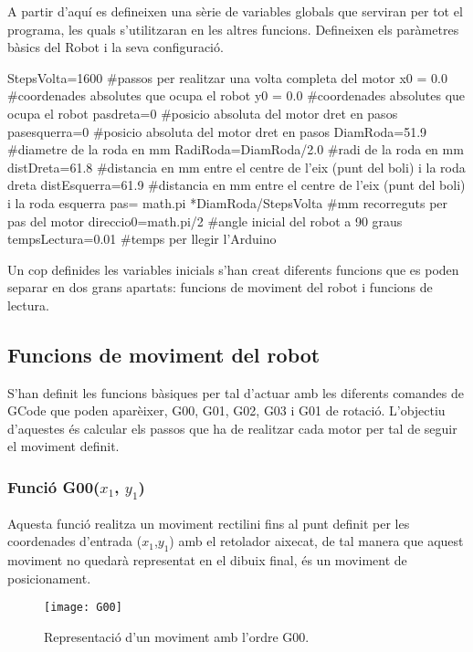 A partir d’aquí es defineixen una sèrie de variables globals que serviran per tot el programa, les quals s’utilitzaran en les altres funcions. Defineixen els paràmetres bàsics del Robot i la seva configuració. 

\begin{python}
	StepsVolta=1600  #passos per realitzar una volta completa del motor
	x0 = 0.0  #coordenades absolutes que ocupa el robot
	y0 = 0.0  #coordenades absolutes que ocupa el robot
	pasdreta=0  #posicio absoluta del motor dret en pasos
	pasesquerra=0  #posicio absoluta del motor dret en pasos
	DiamRoda=51.9  #diametre de la roda en mm
	RadiRoda=DiamRoda/2.0  #radi de la roda en mm
	distDreta=61.8  #distancia en mm entre el centre de l'eix (punt del boli) i la roda dreta
	distEsquerra=61.9  #distancia en mm entre el centre de l'eix (punt del boli) i la roda esquerra
	pas= math.pi *DiamRoda/StepsVolta  #mm recorreguts per pas del motor
	direccio0=math.pi/2  #angle inicial del robot a 90 graus
	tempsLectura=0.01  #temps per llegir l'Arduino 
\end{python}


Un cop definides les variables inicials s’han creat diferents funcions que es poden separar en dos grans apartats: funcions de moviment del robot i funcions de lectura. 

\subsection{Funcions de moviment del robot}
S’han definit les funcions bàsiques per tal d’actuar amb les diferents comandes de GCode que poden aparèixer, G00, G01, G02, G03 i G01 de rotació. L’objectiu d’aquestes és calcular els passos que ha de realitzar cada motor per tal de seguir el moviment definit. 

\subsubsection{Funció G00($x_{1}$, $y_{1}$)}\label{sec:G00}

Aquesta funció realitza un moviment rectilini fins al punt definit per les coordenades d’entrada ($x_{1}$,$y_{1}$) amb el retolador aixecat, de tal manera que aquest moviment no quedarà representat en el dibuix final, és un moviment de posicionament.

\begin{figure}[H]
	\centering
	\texttt{[image: G00]}
	\caption{Representació d'un moviment amb l'ordre G00.}
	\label{fig:G00}
\end{figure}


